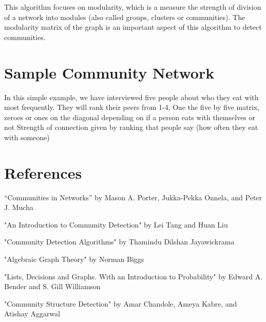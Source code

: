 \documentclass{article}
\begin{document}
\noindent This algorithm focuses on modularity, which is a measure the strength of division of a network into modules (also called groups, clusters or communities). The modularity matrix of the graph is an important aspect of this algorithm to detect communities. 


\section{Sample Community Network}
In this simple example, we have interviewed five people about who they eat with most frequently. They will rank their peers from 1-4, 
One the five by five matrix, zeroes or ones on the diagonal depending on if a person eats with themselves or not
Strength of connection given by ranking that people say (how often they eat with someone)

\section*{References}
“Communities in Networks” by Mason A. Porter, Jukka-Pekka Onnela, and Peter J. Mucha

\bigskip 

\noindent "An Introduction to Community Detection" by Lei Tang and Huan Liu

\bigskip 

\noindent "Community Detection Algorithms" by Thamindu Dilshan Jayawickrama

\bigskip 

\noindent "Algebraic Graph Theory" by Norman Biggs

\bigskip 

\noindent "Lists, Decisions and Graphs. With an Introduction to Probability" by Edward A. Bender and S. Gill Williamson

\bigskip 

\noindent "Community Structure Detection" by Amar Chandole, Ameya Kabre, and Atishay Aggarwal


\end{document}
